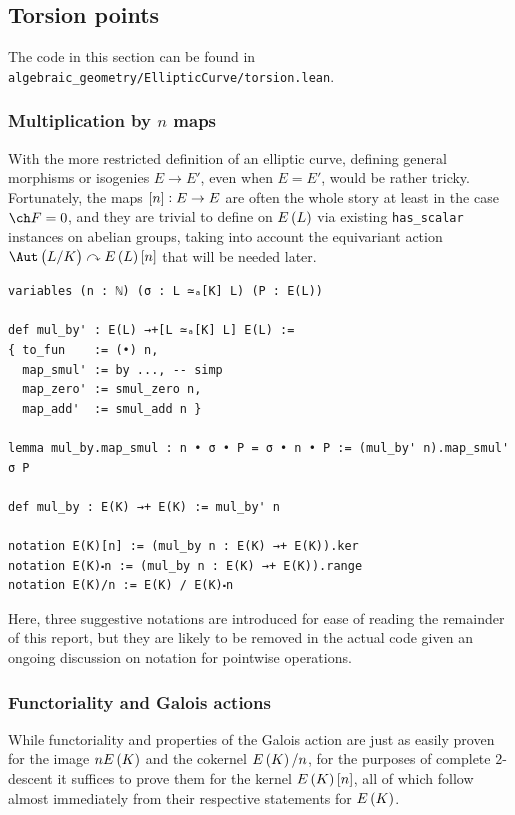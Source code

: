 \pagebreak

\subsection{Torsion points}

The code in this section can be found in \texttt{algebraic\_geometry/EllipticCurve/torsion.lean}.

\subsubsection{Multiplication by \texorpdfstring{$ n $}{n} maps}

With the more restricted definition of an elliptic curve, defining general morphisms or isogenies $ E \to E' $, even when $ E = E' $, would be rather tricky. Fortunately, the maps $ \sbr{n} : E \to E $ are often the whole story at least in the case $ \ch F = 0 $, and they are trivial to define on $ E\br{L} $ via existing \texttt{has\_scalar} instances on abelian groups, taking into account the equivariant action $ \Aut\br{L / K} \curvearrowright E\br{L}\sbr{n} $ that will be needed later.

\begin{lstlisting}[frame=single]
variables (n : ℕ) (σ : L ≃ₐ[K] L) (P : E(L))

def mul_by' : E(L) →+[L ≃ₐ[K] L] E(L) :=
{ to_fun    := (•) n,
  map_smul' := by ..., -- simp
  map_zero' := smul_zero n,
  map_add'  := smul_add n }

lemma mul_by.map_smul : n • σ • P = σ • n • P := (mul_by' n).map_smul' σ P

def mul_by : E(K) →+ E(K) := mul_by' n

notation E(K)[n] := (mul_by n : E(K) →+ E(K)).ker
notation E(K)⬝n := (mul_by n : E(K) →+ E(K)).range
notation E(K)/n := E(K) / E(K)⬝n
\end{lstlisting}

Here, three suggestive notations are introduced for ease of reading the remainder of this report, but they are likely to be removed in the actual code given an ongoing discussion on notation for pointwise operations.

\subsubsection{Functoriality and Galois actions}

While functoriality and properties of the Galois action are just as easily proven for the image $ nE\br{K} $ and the cokernel $ E\br{K} / n $, for the purposes of complete $ 2 $-descent it suffices to prove them for the kernel $ E\br{K}\sbr{n} $, all of which follow almost immediately from their respective statements for $ E\br{K} $.

